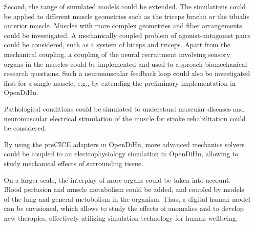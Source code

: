 Second, the range of simulated models could be extended. The simulations could be applied to different muscle geometries such as the triceps brachii or the tibialis anterior muscle. Muscles with more complex geometries and fiber arrangements could be investigated. 
A mechanically coupled problem of agonist-antagonist pairs could be considered, such as a system of biceps and triceps. Apart from the mechanical coupling, a coupling of the neural recruitment involving sensory organs in the muscles could be implemented and used to approach biomechanical research questions. Such a neuromuscular feedback loop could also be investigated first for a single muscle, e.g., by extending the preliminary implementation in OpenDiHu.

Pathological conditions could be simulated to understand muscular diseases and neuromuscular electrical stimulation of the muscle for stroke rehabilitation could be considered.

By using the preCICE adapters in OpenDiHu, more advanced mechanics solvers could be coupled to an electrophysiology simulation in OpenDiHu, allowing to study mechanical effects of surrounding tissue.

On a larger scale, the interplay of more organs could be taken into account. Blood perfusion and muscle metabolism could be added, and coupled by models of the lung and general metabolism in the organism. Thus, a digital human model can be envisioned, which allows to study the effects of anomalies and to develop new therapies, effectively utilizing simulation technology for human wellbeing.




% 






